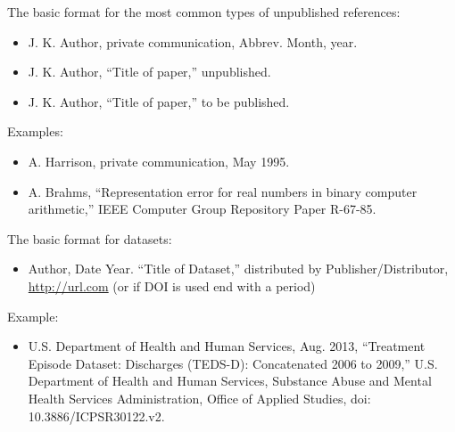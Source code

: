 \documentclass[11pt,a4paper]{article}
\begin{document}
The basic format for the most common types of unpublished references:
\begin{itemize}
    \item J. K. Author, private communication, Abbrev. Month, year.
    \item J. K. Author, “Title of paper,” unpublished.
    \item J. K. Author, “Title of paper,” to be published.
\end{itemize}
Examples:
\begin{itemize}
    \item A. Harrison, private communication, May 1995.
    \item A. Brahms, “Representation error for real numbers in binary computer arithmetic,” IEEE Computer Group Repository Paper R-67-85.
\end{itemize}

The basic format for datasets:
\begin{itemize}
    \item Author, Date Year. “Title of Dataset,” distributed by Publisher/Distributor, \url{http://url.com} (or if DOI is used end with a period)
\end{itemize}
Example:
\begin{itemize}
    \item U.S. Department of Health and Human Services, Aug. 2013, “Treatment Episode Dataset: Discharges (TEDS-D): Concatenated 2006 to 2009,” U.S. Department of Health and Human Services, Substance Abuse and Mental Health Services Administration, Office of Applied Studies, doi: 10.3886/ICPSR30122.v2.
\end{itemize}




% 

\end{document}
